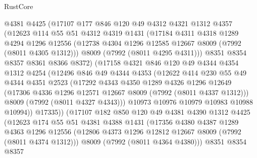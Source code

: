 \begin{lexlean}{RustCore}
\begin{coremodule}
            @4381
            @4425
            (@17107
              @177
              @846
              @120
              @49
              @4312
              @4321
              @1312
              @4357
              (@12623
                @114
                @55
                @51
                @4312
                @4319
                @1431
                (@17184
                  @4311
                  @4318
                  @1289
                  @4294
                  @1296
                  @12556
                  (@12738 @4304 @1296 @12585 @12667 @8009 (@7992 (@8011 @4305 @1312)))
                  @8009
                  (@7992 (@8011 @4295 @4311)))
                @8351
                @8354
                @8357
                @8361
                @8366
                @8372)
              (@17158
                @4321
                @846
                @120
                @49
                @4344
                @4354
                @1312
                @4254
                (@12496
                  @846
                  @49
                  @4344
                  @4353
                  (@12622
                    @414
                    @230
                    @55
                    @49
                    @4344
                    @4351
                    @2523
                    (@17292
                      @4343
                      @4350
                      @1289
                      @4326
                      @1296
                      @12649
                      (@17306 @4336 @1296 @12571 @12667 @8009 (@7992 (@8011 @4337 @1312)))
                      @8009
                      (@7992 (@8011 @4327 @4343)))
                    @10973
                    @10976
                    @10979
                    @10983
                    @10988
                    @10994))
                @17335))
            (@17107
              @182
              @850
              @120
              @49
              @4381
              @4390
              @1312
              @4425
              (@12623
                @174
                @55
                @51
                @4381
                @4388
                @1431
                (@17356
                  @4380
                  @4387
                  @1289
                  @4363
                  @1296
                  @12556
                  (@12806 @4373 @1296 @12812 @12667 @8009 (@7992 (@8011 @4374 @1312)))
                  @8009
                  (@7992 (@8011 @4364 @4380)))
                @8351
                @8354
                @8357

\end{coremodule}
\end{lexlean}
